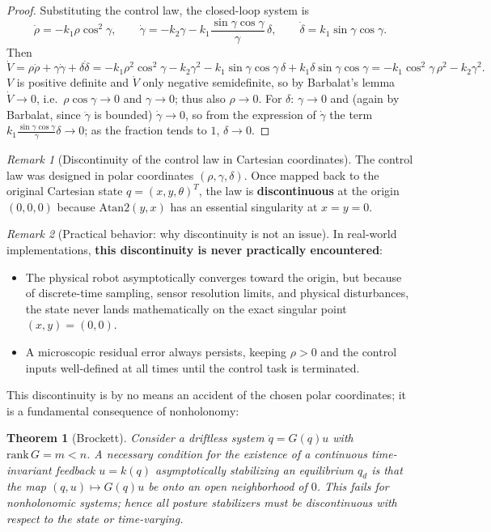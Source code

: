 \documentclass[11pt,a4paper]{article}
\def\bm#1{#1}%
\theoremstyle{definition}
\theoremstyle{plain}
\newtheorem{theorem}[definition]{Theorem}
\theoremstyle{remark}
\newtheorem*{remark}{Remark}
\begin{document}
\begin{proof}
Substituting the control law, the closed-loop system is
\[
\dot\rho=-k_1\rho\cos^2\!\gamma,\qquad
\dot\gamma=-k_2\gamma-k_1\frac{\sin\gamma\cos\gamma}{\gamma}\,\delta,\qquad
\dot\delta=k_1\sin\gamma\cos\gamma .
\]
Then
\[
\dot V=\rho\dot\rho+\gamma\dot\gamma+\delta\dot\delta=-k_1\rho^2\cos^2\!\gamma-k_2\gamma^2-k_1\sin\gamma\cos\gamma\,\delta+k_1\delta\sin\gamma\cos\gamma=-k_1\cos^2\!\gamma\,\rho^2-k_2\gamma^2 .
\]
$V$ is positive definite and $\dot V$ only negative semidefinite, so by Barbalat's lemma $\dot V\to0$, i.e.\ $\rho\cos\gamma\to0$ and $\gamma\to0$; thus also $\rho\to0$. For $\delta$: $\gamma\to0$ and (again by Barbalat, since $\ddot\gamma$ is bounded) $\dot\gamma\to0$, so from the expression of $\dot\gamma$ the term $k_1\frac{\sin\gamma\cos\gamma}{\gamma}\delta\to0$; as the fraction tends to $1$, $\delta\to0$.
\end{proof}

\begin{remark}[Discontinuity of the control law in Cartesian coordinates]
The control law was designed in polar coordinates $(\rho,\gamma,\delta)$. Once mapped back to the original Cartesian state $\bm q=(x,y,\theta)^T$, the law is \textbf{discontinuous} at the origin $(0,0,0)$ because $\mathrm{Atan2}(y,x)$ has an essential singularity at $x=y=0$.
\end{remark}

\begin{remark}[Practical behavior: why discontinuity is not an issue]
In real-world implementations, \textbf{this discontinuity is never practically encountered}:
\begin{itemize}[leftmargin=*,nosep]
\item The physical robot asymptotically converges toward the origin, but because of discrete-time sampling, sensor resolution limits, and physical disturbances, the state never lands mathematically on the exact singular point $(x,y)=(0,0)$.
\item A microscopic residual error always persists, keeping $\rho>0$ and the control inputs well-defined at all times until the control task is terminated.
\end{itemize}
\end{remark}

This discontinuity is by no means an accident of the chosen polar coordinates; it is a fundamental consequence of nonholonomy:

\begin{theorem}[Brockett]\label{thm:brockett}
Consider a driftless system $\dot{\bm q}=\bm G(\bm q)\bm u$ with $\mathrm{rank}\,\bm G=m<n$. A necessary condition for the existence of a continuous time-invariant feedback $\bm u=\bm k(\bm q)$ asymptotically stabilizing an equilibrium $\bm q_d$ is that the map $(\bm q,\bm u)\mapsto\bm G(\bm q)\bm u$ be onto an open neighborhood of $\bm 0$. This fails for nonholonomic systems; hence all posture stabilizers must be \emph{discontinuous with respect to the state} or \emph{time-varying}.
\end{theorem}
\end{document}
